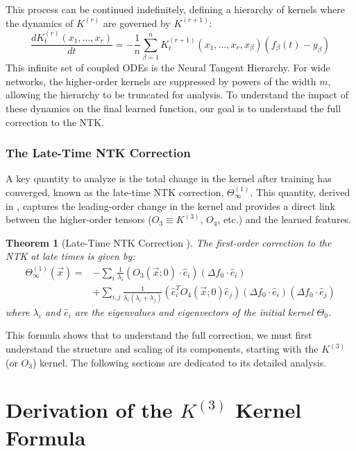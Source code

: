 \documentclass{article}
\newtheorem{theorem}{Theorem}[section]
\begin{document}
This process can be continued indefinitely, defining a hierarchy of kernels where the dynamics of $K^{(r)}$ are governed by $K^{(r+1)}$:
\begin{equation}
\frac{dK_t^{(r)}(x_1, \dots, x_r)}{dt} = -\frac{1}{n} \sum_{\beta=1}^n K^{(r+1)}_t(x_1, \dots, x_r, x_\beta)(f_\beta(t)-y_\beta)
\end{equation}
This infinite set of coupled ODEs is the Neural Tangent Hierarchy. For wide networks, the higher-order kernels are suppressed by powers of the width $m$, allowing the hierarchy to be truncated for analysis. To understand the impact of these dynamics on the final learned function, our goal is to understand the full correction to the NTK.

\subsubsection{The Late-Time NTK Correction}
A key quantity to analyze is the total change in the kernel after training has converged, known as the late-time NTK correction, $\Theta^{(1)}_\infty$. This quantity, derived in \cite{large-width-feynman}, captures the leading-order change in the kernel and provides a direct link between the higher-order tensors ($O_3 \equiv K^{(3)}$, $O_4$, etc.) and the learned features.

\begin{theorem}[Late-Time NTK Correction \cite{large-width-feynman}]
The first-order correction to the NTK at late times is given by:
\begin{align}
\Theta^{(1)}_\infty(\vec{x}) = & -\sum_{i}\frac{1}{\lambda_{i}}(O_{3}(\vec{x};0)\cdot\hat{e}_{i})(\Delta f_{0}\cdot\hat{e}_{i}) \nonumber \\
& + \sum_{i,j}\frac{1}{\lambda_{i}(\lambda_{i}+\lambda_{j})}(\hat{e}_{i}^{T}O_{4}(\vec{x};0)\hat{e}_{j})(\Delta f_{0}\cdot \hat{e}_{i})(\Delta f_{0}\cdot \hat{e}_{j})
\label{eq:theta_correction}
\end{align}
where $\lambda_i$ and $\hat{e}_i$ are the eigenvalues and eigenvectors of the initial kernel $\Theta_0$.
\end{theorem}

This formula shows that to understand the full correction, we must first understand the structure and scaling of its components, starting with the $K^{(3)}$ (or $O_3$) kernel. The following sections are dedicated to its detailed analysis.

\section{Derivation of the $K^{(3)}$ Kernel Formula}
\end{document}
